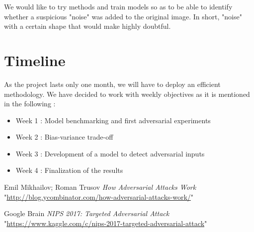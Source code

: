 \documentclass{article}
\begin{document}
We would like to try methods and train models so as to be able to identify whether a suspicious "noise" was added to the original image. In short, "noise" with a certain shape that would make highly doubtful.

\section{Timeline}

As the project lasts only one month, we will have to deploy an efficient methodology. We have decided to work with weekly objectives as it is mentioned in the following :
\begin{itemize}
    \item Week 1 : Model benchmarking and first adversarial experiments
    \item Week 2 : Bias-variance trade-off
    \item Week 3 : Development of a model to detect adversarial inputs
    \item Week 4 : Finalization of the results
\end{itemize}



\begin{thebibliography}{1}

   Emil Mikhailov; Roman Trusov {\em How Adversarial Attacks Work} 
  "\url{http://blog.ycombinator.com/how-adversarial-attacks-work/}"

   Google Brain {\em NIPS 2017: Targeted Adversarial Attack} 
  "\url{https://www.kaggle.com/c/nips-2017-targeted-adversarial-attack}"


  \end{thebibliography}
\end{document}
